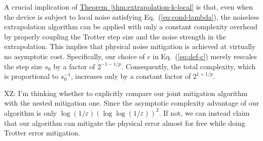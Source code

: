 \documentclass[aps,pra,reprint,groupedaddress,floatfix]{revtex4-2}
\newcommand{\eq}[1]{(\ref{eq:#1})}
\newcommand{\thm}[1]{\hyperref[thm:#1]{Theorem~\ref*{thm:#1}}}
\newcommand{\eps}{\varepsilon}
\newcommand{\xz}[1]{{\color{cyan} XZ: #1}}
\begin{document}
A crucial implication of \thm{extrapolation-k-local} is that, even when the device is subject to local noise satisfying Eq.~\eq{cond-lambda}, the noiseless extrapolation algorithm can be applied with only a constant complexity overhead by properly coupling the Trotter step size and the noise strength in the extrapolation. This implies that physical noise mitigation is achieved at virtually no asymptotic cost. Specifically, our choice of $c$ in Eq.~\eq{def-c} merely rescales the step size $s_0$ by a factor of $2^{-1-1/p}$. Consequently, the total complexity, which is proportional to $s_0^{-1}$, increases only by a constant factor of $2^{1+1/p}$.

\xz{I'm thinking whether to explicitly compare our joint mitigation algorithm with the nested mitigation one. Since the asymptotic complexity advantage of our algorithm is only $\log(1/\eps)(\log\log(1/\eps))^2$. If not, we can instead claim that our algorithm can mitigate the physical error almost for free while doing Trotter error mitigation. }
\end{document}
